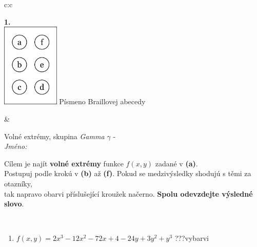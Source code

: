 \documentclass[10pt]{report}
\begin{document}
\begin{tabular}{c:c}
\begin{minipage}[c][104.5mm][t]{0.5\linewidth}
\begin{center}
\begin{minipage}{0.79\linewidth}
\begin{center}
\begin{varwidth}{\linewidth}
\begin{enumerate}
\end{enumerate}
\end{varwidth}
\end{center}
\end{minipage}
\begin{minipage}{0.20\linewidth}
\begin{center}
{\Huge\bfseries 1.} \\[2mm]
\includegraphics[height=40mm]{../images/braille.png}
{\small Písmeno Braillovej abecedy}
\end{center}
\end{minipage}
\end{center}
\end{minipage}
&
\begin{minipage}[c][104.5mm][t]{0.5\linewidth}
\begin{center}
\vspace{7mm}
{\huge Volné extrémy, skupina \textit{Gamma $\gamma$} -}\\[5mm]
\textit{Jméno:}\phantom{xxxxxxxxxxxxxxxxxxxxxxxxxxxxxxxxxxxxxxxxxxxxxxxxxxxxxxxxxxxxxxxxx}\\[5mm]
\begin{minipage}{0.95\linewidth}
\begin{center}
Cílem je najít \textbf{volné extrémy} funkce $f(x,y)$ zadané v \textbf{(a)}.\\Postupuj podle krokú v \textbf{(b)} až \textbf{(f)}. Pokud se medzivýsledky shodujú s těmi za otazníky,\\tak napravo obarvi příslušející kroužek načerno. \textbf{Spolu odevzdejte výsledné slovo}.
\end{center}
\end{minipage}
\\[1mm]
\begin{minipage}{0.79\linewidth}
\begin{center}
\begin{varwidth}{\linewidth}
\begin{enumerate}
\normalsize
\item $f(x,y)=2x^3-12x^2-72x+4-24y+3y^2+y^3$\quad \dotfill\; ???\;\dotfill \quad vybarvi

\end{enumerate}
\end{varwidth}
\end{center}
\end{minipage}
\end{center}
\end{minipage}
\end{tabular}
\end{document}
